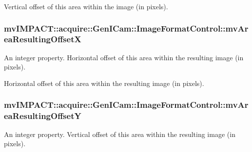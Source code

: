 Vertical offset of this area within the image (in pixels). \hypertarget{classmv_i_m_p_a_c_t_1_1acquire_1_1_gen_i_cam_1_1_image_format_control_ada77ff6906f66a517387bb52d7fb755f}{
\subsubsection[{mv\+Area\+Resulting\+Offset\+X}]{ mv\+I\+M\+P\+A\+C\+T\+::acquire\+::\+Gen\+I\+Cam\+::\+Image\+Format\+Control\+::mv\+Area\+Resulting\+Offset\+X}}\label{classmv_i_m_p_a_c_t_1_1acquire_1_1_gen_i_cam_1_1_image_format_control_ada77ff6906f66a517387bb52d7fb755f}


An integer property. Horizontal offset of this area within the resulting image (in pixels). 

Horizontal offset of this area within the resulting image (in pixels). \hypertarget{classmv_i_m_p_a_c_t_1_1acquire_1_1_gen_i_cam_1_1_image_format_control_a6df2ff8dd4593af0221154f44878f7fd}{
\subsubsection[{mv\+Area\+Resulting\+Offset\+Y}]{ mv\+I\+M\+P\+A\+C\+T\+::acquire\+::\+Gen\+I\+Cam\+::\+Image\+Format\+Control\+::mv\+Area\+Resulting\+Offset\+Y}}\label{classmv_i_m_p_a_c_t_1_1acquire_1_1_gen_i_cam_1_1_image_format_control_a6df2ff8dd4593af0221154f44878f7fd}


An integer property. Vertical offset of this area within the resulting image (in pixels). 

